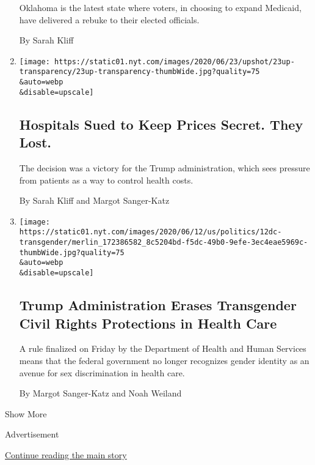 \begin{enumerate}
  Oklahoma is the latest state where voters, in choosing to expand
  Medicaid, have delivered a rebuke to their elected officials.

  By Sarah Kliff
\item
  \href{/2020/06/23/upshot/hospitals-lost-price-transparency-lawsuit.html}{}

  \texttt{[image: https://static01.nyt.com/images/2020/06/23/upshot/23up-transparency/23up-transparency-thumbWide.jpg?quality=75\\\&auto=webp\\\&disable=upscale]}

  \hypertarget{hospitals-sued-to-keep-prices-secret-they-lost}{%
  \subsection{Hospitals Sued to Keep Prices Secret. They
  Lost.}\label{hospitals-sued-to-keep-prices-secret-they-lost}}

  The decision was a victory for the Trump administration, which sees
  pressure from patients as a way to control health costs.

  By Sarah Kliff and Margot Sanger-Katz
\item
  \href{/2020/06/12/us/politics/trump-transgender-rights.html}{}

  \texttt{[image: https://static01.nyt.com/images/2020/06/12/us/politics/12dc-transgender/merlin\_172386582\_8c5204bd-f5dc-49b0-9efe-3ec4eae5969c-thumbWide.jpg?quality=75\\\&auto=webp\\\&disable=upscale]}

  \hypertarget{trump-administration-erases-transgender-civil-rights-protections-in-health-care}{%
  \subsection{Trump Administration Erases Transgender Civil Rights
  Protections in Health
  Care}\label{trump-administration-erases-transgender-civil-rights-protections-in-health-care}}

  A rule finalized on Friday by the Department of Health and Human
  Services means that the federal government no longer recognizes gender
  identity as an avenue for sex discrimination in health care.

  By Margot Sanger-Katz and Noah Weiland
\end{enumerate}

Show More

Advertisement

\protect\hyperlink{after-mid1}{Continue reading the main story}

